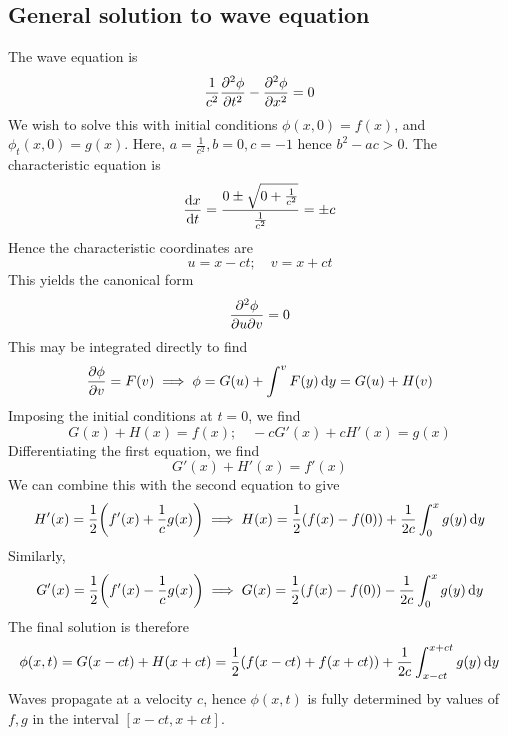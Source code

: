 \subsection{General solution to wave equation}
The wave equation is
\[
	\frac{1}{c^2} \pdv[2]{\phi}{t} - \pdv[2]{\phi}{x} = 0
\]
We wish to solve this with initial conditions \( \phi(x,0) = f(x) \), and \( \phi_t(x,0) = g(x) \).
Here, \( a = \frac{1}{c^2}, b = 0, c = -1 \) hence \( b^2 - ac > 0 \).
The characteristic equation is
\[
	\dv{x}{t} = \frac{0 \pm \sqrt{0 + \frac{1}{c^2}}}{\frac{1}{c^2}} = \pm c
\]
Hence the characteristic coordinates are
\[
	u = x - ct;\quad v = x + ct
\]
This yields the canonical form
\[
	\pdv{\phi}{u}{v} = 0
\]
This may be integrated directly to find
\[
	\pdv{\phi}{v} = F(v) \implies \phi = G(u) + \int^v F(y) \dd{y} = G(u) + H(v)
\]
Imposing the initial conditions at \( t = 0 \), we find
\[
	G(x) + H(x) = f(x);\quad -cG'(x) + cH'(x) = g(x)
\]
Differentiating the first equation, we find
\[
	G'(x) + H'(x) = f'(x)
\]
We can combine this with the second equation to give
\[
	H'(x) = \frac{1}{2} \qty(f'(x) + \frac{1}{c}g(x)) \implies H(x) = \frac{1}{2} \qty(f(x) - f(0)) + \frac{1}{2c}\int_0^x g(y) \dd{y}
\]
Similarly,
\[
	G'(x) = \frac{1}{2} \qty(f'(x) - \frac{1}{c}g(x)) \implies G(x) = \frac{1}{2} \qty(f(x) - f(0)) - \frac{1}{2c}\int_0^x g(y) \dd{y}
\]
The final solution is therefore
\[
	\phi(x,t) = G(x-ct) + H(x+ct) = \frac{1}{2}\qty(f(x-ct) + f(x+ct)) + \frac{1}{2c} \int_{x-ct}^{x+ct} g(y) \dd{y}
\]
Waves propagate at a velocity \( c \), hence \( \phi(x,t) \) is fully determined by values of \( f, g \) in the interval \( [x-ct, x+ct] \).

